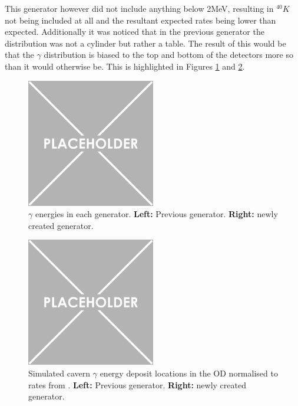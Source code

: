 \par
This generator however did not include anything below 2MeV, resulting in $^{40}K$ not being included at all and the resultant expected rates being lower than expected.
Additionally it was noticed that in the previous generator the distribution was not a cylinder but rather a table.
The result of this would be that the $\gamma$ distribution is biased to the top and bottom of the detectors more so than it would otherwise be.
This is highlighted in Figures \ref{fig:cavern_gamma_energy_distribution} and \ref{fig:cavern_gamma_position_distribution}.

\begin{figure}
    \centering
    \includegraphics[width=0.5\textwidth]{Figures/Placeholder.png}
    \caption{$\gamma$ energies in each generator. \textbf{Left:} Previous generator. \textbf{Right:} newly created generator.}
    \label{fig:cavern_gamma_energy_distribution}
\end{figure}


\begin{figure}
    \centering
    \includegraphics[width=0.5\textwidth]{Figures/Placeholder.png}
    \caption{Simulated cavern $\gamma$ energy deposit locations in the OD normalised to rates from \cite{LZ_Gamma_Ray_Background_ref}. \textbf{Left:} Previous generator. \textbf{Right:} newly created generator.}
    \label{fig:cavern_gamma_position_distribution}
\end{figure}


